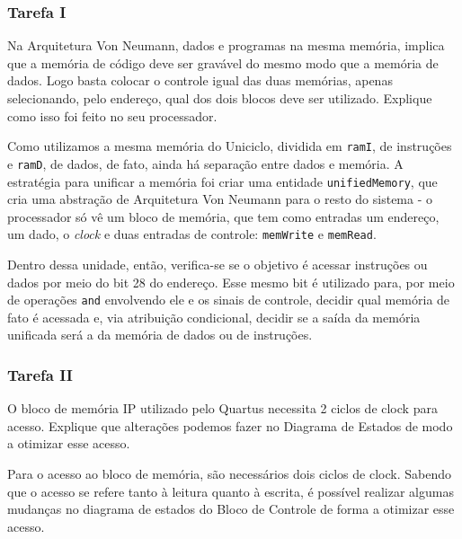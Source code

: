 \documentclass[a4paper,12pt]{article}
\newcommand{\cod}[1]{\texttt{#1}}
\begin{document}
\subsubsection{Tarefa I}
\begin{tcolorbox}[title=Enunciado, colback=blue!5!white, colframe=blue!75!black]

Na Arquitetura Von Neumann, dados e programas na mesma memória, implica que a memória de código deve ser gravável do mesmo modo que a memória de dados. Logo basta colocar o controle igual das duas memórias, apenas selecionando, pelo endereço, qual dos dois blocos deve ser utilizado. Explique como isso foi feito no seu processador. 
\end{tcolorbox}

Como utilizamos a mesma memória do Uniciclo, dividida em \cod{ramI}, de instruções e \cod{ramD}, de dados, de fato, ainda há separação entre dados e memória. A estratégia para unificar a memória foi criar uma entidade \cod{unifiedMemory}, que cria uma abstração de Arquitetura Von Neumann para o resto do sistema - o processador só vê um bloco de memória, que tem como entradas um endereço, um dado, o \textit{clock} e duas entradas de controle: \cod{memWrite} e \cod{memRead}.

Dentro dessa unidade, então, verifica-se se o objetivo é acessar instruções ou dados por meio do bit 28 do endereço. Esse mesmo bit é utilizado para, por meio de operações \cod{and} envolvendo ele e os sinais de controle, decidir qual memória de fato é acessada e, via atribuição condicional, decidir se a saída da memória unificada será a da memória de dados ou de instruções. 

\subsubsection{Tarefa II}
\begin{tcolorbox}[title=Enunciado, colback=blue!5!white, colframe=blue!75!black]

O bloco de memória IP utilizado pelo Quartus necessita 2 ciclos de clock para acesso. Explique que alterações podemos fazer no Diagrama de Estados de modo a otimizar esse acesso. 
\end{tcolorbox}

Para o acesso ao bloco de memória, são necessários dois ciclos de clock. Sabendo que o acesso se refere tanto à leitura quanto à escrita, é possível realizar algumas mudanças no diagrama de estados do Bloco de Controle de forma a otimizar esse acesso.
\end{document}
